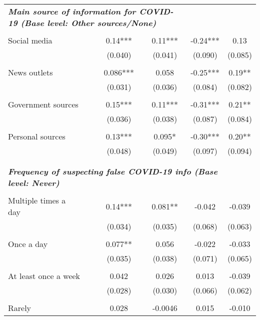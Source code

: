\documentclass{article}[12pt]
\begin{document}
\begin{table}[!h]
{\begin{tabular}{lccccc}
                    \multicolumn{4}{l}{\bf \textit{Main source of information for COVID-19 (Base level: Other sources/None)}} \\
                     \\
                    Social media &  & 0.14*** & 0.11*** & -0.24*** & 0.13 \\
                     &  & (0.040) & (0.041) & (0.090) & (0.085) \\
                     \\
                    News outlets &  & 0.086*** & 0.058 & -0.25*** & 0.19** \\
                     &  & (0.031) & (0.036) & (0.084) & (0.082) \\
                     \\
                    Government sources
                     &  & 0.15*** & 0.11*** & -0.31*** & 0.21** \\
                     &  & (0.036) & (0.038) & (0.087) & (0.084) \\
                     \\
                    Personal sources &  & 0.13*** & 0.095* & -0.30*** & 0.20** \\
                     &  & (0.048) & (0.049) & (0.097) & (0.094) \\
                     \\\\
                    \multicolumn{5}{l}{\bf \textit{Frequency of suspecting false COVID-19 info (Base level: Never)}} \\
                     \\
                    Multiple times a day
                     &  & 0.14*** & 0.081** & -0.042 & -0.039 \\
                     &  & (0.034) & (0.035) & (0.068) & (0.063) \\
                     \\
                    Once a day &  & 0.077** & 0.056 & -0.022 & -0.033 \\
                     &  & (0.035) & (0.038) & (0.071) & (0.065) \\
                     \\
                    At least once a week &  & 0.042 & 0.026 & 0.013 & -0.039 \\
                     &  & (0.028) & (0.030) & (0.066) & (0.062) \\
                     \\
                    Rarely &  & 0.028 & -0.0046 & 0.015 & -0.010 \\

\end{tabular}}
\end{table}
\end{document}
